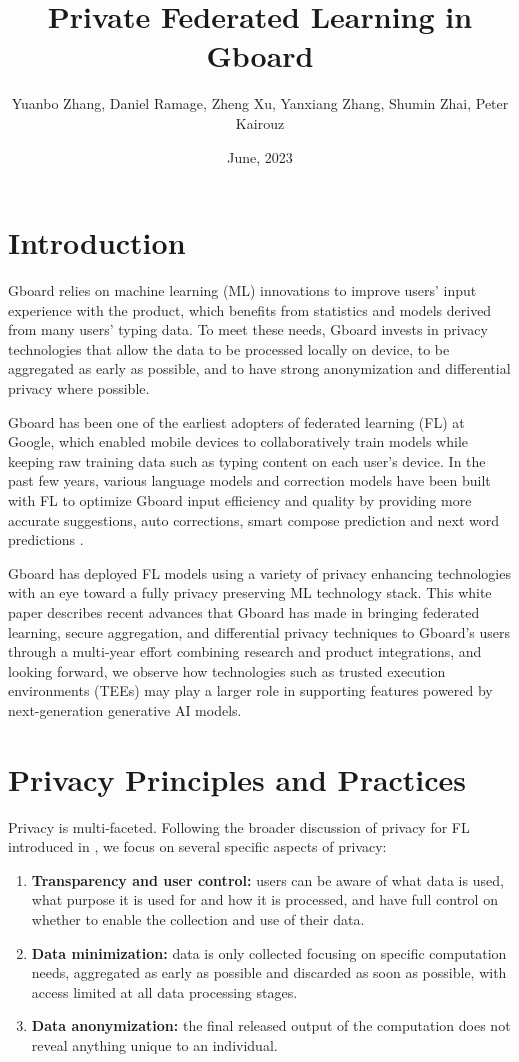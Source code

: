 \documentclass{article}
\title{Private Federated Learning in Gboard}
\author{Yuanbo Zhang, Daniel Ramage, Zheng Xu, Yanxiang Zhang, Shumin Zhai, Peter Kairouz}
\affil{Google}
\date{June, 2023}
\begin{document}
\maketitle

\section{Introduction}

Gboard relies on machine learning (ML) innovations to improve users’ input experience with the product, which benefits from statistics and models derived from many users’ typing data. To meet these needs, Gboard invests in privacy technologies that allow the data to be processed locally on device, to be aggregated as early as possible, and to have strong anonymization and differential privacy where possible.

Gboard has been one of the earliest adopters of federated learning (FL) \cite{flsysdesign} at Google, which enabled mobile devices to collaboratively train models while keeping raw training data such as typing content on each user's device. In the past few years, various language models and correction models have been built with FL to optimize Gboard input efficiency and quality by providing more accurate suggestions, auto corrections, smart compose prediction and next word predictions \cite{kbnwp}.

Gboard has deployed FL models using a variety of privacy enhancing technologies with an eye toward a fully privacy preserving ML technology stack. This white paper describes recent advances that Gboard has made in bringing federated learning, secure aggregation, and differential privacy techniques to Gboard’s users through a multi-year effort combining research and product integrations, and looking forward, we observe how technologies such as trusted execution environments (TEEs) may play a larger role in supporting features powered by next-generation generative AI models.

\section{Privacy Principles and Practices}

Privacy is multi-faceted. Following the broader discussion of privacy for FL introduced in \cite{flprivacy}, we focus on several specific aspects of privacy:

\begin{enumerate}
\item \textbf{Transparency and user control:} users can be aware of what data is used, what purpose it is used for and how it is processed, and have full control on whether to enable the collection and use of their data.
\item \textbf{Data minimization:} data is only collected focusing on specific computation needs, aggregated as early as possible and discarded as soon as possible, with access limited at all data processing stages.
\item \textbf{Data anonymization:} the final released output of the computation does not reveal anything unique to an individual.
\end{enumerate}
\end{document}
